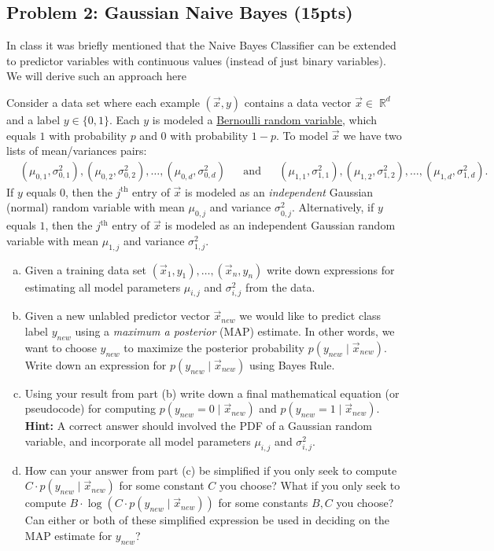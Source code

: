 \documentclass[10pt]{article}
\DeclareMathOperator{\R}{\mathbb{R}}
\begin{document}
\subsection{Problem 2: Gaussian Naive Bayes (15pts)}
In class it was briefly mentioned that the Naive Bayes Classifier can be extended to predictor variables with continuous values (instead of just binary variables). We will derive such an approach here

Consider a data set where each example $(\vec{x},y)$ contains a data vector $\vec{x}\in \R^d$ and a label $y\in \{0,1\}$. Each $y$ is modeled a \href{https://en.wikipedia.org/wiki/Bernoulli_distribution}{Bernoulli random variable}, which equals $1$ with probability $p$ and $0$ with probability $1-p$. To model $\vec{x}$ we have two lists of mean/variances pairs: 
\begin{align*}
&(\mu_{0,1}, \sigma_{0,1}^2), (\mu_{0,2}, \sigma_{0,2}^2), \ldots, (\mu_{0,d}, \sigma_{0,d}^2)& &\text{and}& &(\mu_{1,1}, \sigma_{1,1}^2), (\mu_{1,2}, \sigma_{1,2}^2), \ldots, (\mu_{1,d}, \sigma_{1,d}^2).
\end{align*} 
If $y$ equals $0$, then the $j^\text{th}$ entry of $\vec{x}$ is modeled as an \emph{independent} Gaussian (normal) random variable with mean $\mu_{0,j}$ and variance $\sigma_{0,j}^2$. Alternatively, if $y$ equals $1$, then the $j^\text{th}$ entry of $\vec{x}$ is modeled as an {independent}  Gaussian random variable with mean $\mu_{1,j}$ and variance $\sigma_{1,j}^2$.
\begin{enumerate}[(a)]
	\item Given a training data set $(\vec{x}_1,y_1), \ldots, (\vec{x}_n,y_n)$ write down expressions for estimating all model parameters $\mu_{i,j}$ and  $\sigma_{i,j}^2$ from the data.
	
	\item Given a new unlabled predictor vector $\vec{x}_{new}$ we would like to predict class label ${y}_{new}$ using a \emph{maximum a posterior} (MAP) estimate. In other words, we want to choose ${y}_{new}$ to maximize the posterior probability $p({y}_{new} \mid \vec{x}_{new} )$. Write down an expression for $p({y}_{new} \mid \vec{x}_{new} )$ using Bayes Rule.
	
	\item Using your result from part (b) write down a final mathematical equation (or pseudocode) for computing $p({y}_{new}=0\mid \vec{x}_{new} )$ and $p({y}_{new}=1\mid \vec{x}_{new})$. \textbf{Hint:} A correct answer should involved the PDF of a Gaussian random variable, and incorporate all model parameters $\mu_{i,j}$ and  $\sigma_{i,j}^2$.
	
	\item How can your answer from part (c) be simplified if you only seek to compute $C\cdot p({y}_{new}\mid \vec{x}_{new} )$ for some constant $C$ you choose? What if you only seek to compute $B\cdot\log\left(C\cdot p({y}_{new} \mid \vec{x}_{new} )\right)$ for some constants $B,C$ you choose?
	Can either or both of these simplified expression be used in deciding on the MAP estimate for $y_{new}$?
\end{enumerate}
\end{document}
